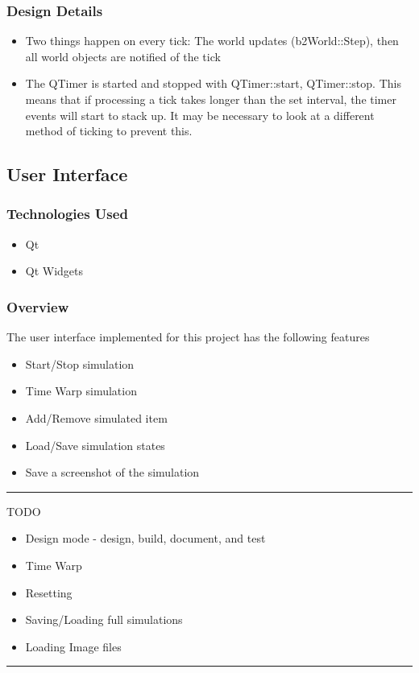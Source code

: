 \subsubsection*{Design Details}
\begin{itemize}
	\item Two things happen on every tick: The world updates (b2World::Step), then all world objects are notified of the tick
	\item The QTimer is started and stopped with QTimer::start, QTimer::stop. This means that if processing a tick takes longer than the set interval, the timer events will start to stack up. It may be necessary to look at a different method of ticking to prevent this.
\end{itemize}

\subsection{User Interface}
\subsubsection*{Technologies Used}
\begin{itemize}
	\item Qt
	\item Qt Widgets
\end{itemize}
\subsubsection*{Overview}
The user interface implemented for this project has the following features
\begin{itemize}
	\item Start/Stop simulation
	\item Time Warp simulation
	\item Add/Remove simulated item
	\item Load/Save simulation states
	\item Save a screenshot of the simulation
\end{itemize}

\hrule
TODO
\begin{itemize}
	\item Design mode - design, build, document, and test
	\item Time Warp
	\item Resetting
	\item Saving/Loading full simulations
	\item Loading Image files
\end{itemize}
\hrule

